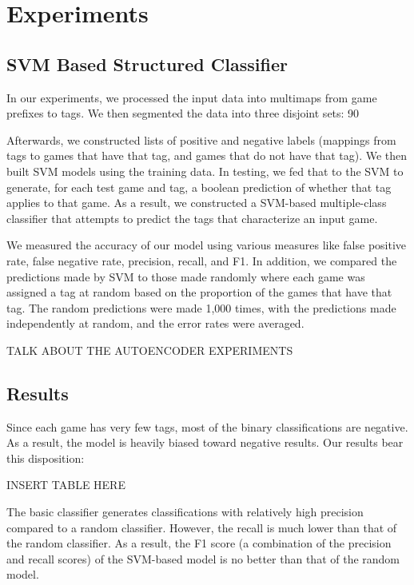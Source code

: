 \documentclass[11pt]{article}
\begin{document}
\section{Experiments}
\subsection{SVM Based Structured Classifier}


In our experiments, we processed the input data into multimaps from game prefixes to tags. We then segmented the data into three disjoint sets: 90%

Afterwards, we constructed lists of positive and negative labels (mappings from tags to games that have that tag, and games that do not have that tag). We then built SVM models using the training data. In testing, we fed that to the SVM to generate, for each test game and tag, a boolean prediction of whether that tag applies to that game. As a result, we constructed a SVM-based multiple-class classifier that attempts to predict the tags that characterize an input game.

We measured the accuracy of our model using various measures like false positive rate, false negative rate, precision, recall, and F1. In addition, we compared the predictions made by SVM to those made randomly where each game was assigned a tag at random based on the proportion of the games that have that tag. The random predictions were made 1,000 times, with the predictions made independently at random, and the error rates were averaged.

TALK ABOUT THE AUTOENCODER EXPERIMENTS

\subsection{Results}
Since each game has very few tags, most of the binary classifications are negative. As a result, the model is heavily biased toward negative results. Our results bear this disposition:

INSERT TABLE HERE

The basic classifier generates classifications with relatively high precision compared to a random classifier. However, the recall is much lower than that of the random classifier. As a result, the F1 score (a combination of the precision and recall scores) of the SVM-based model is no better than that of the random model.
\end{document}
